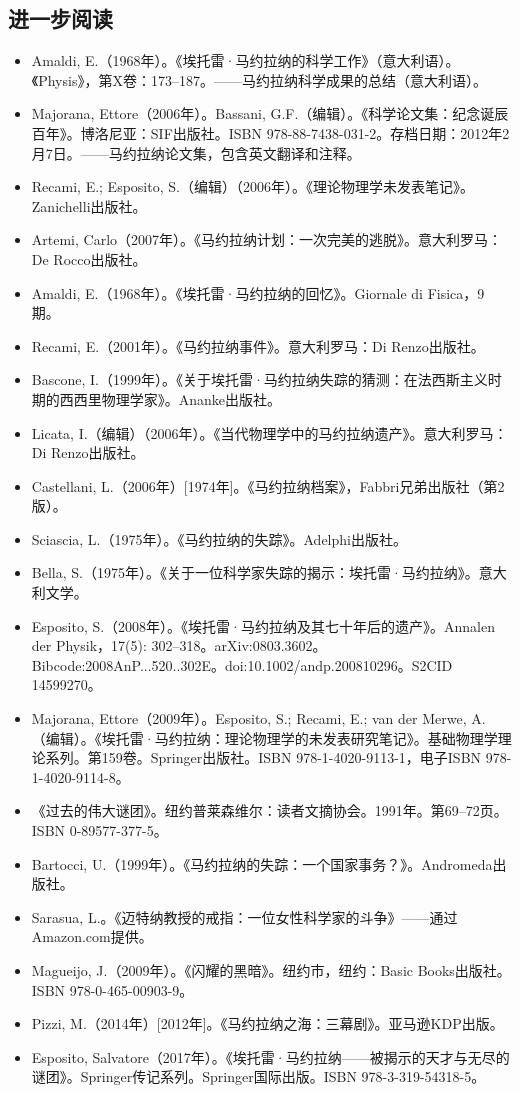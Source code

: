 \subsection{进一步阅读}
\begin{itemize}
\item Amaldi, E.（1968年）。《埃托雷·马约拉纳的科学工作》（意大利语）。《Physis》，第X卷：173–187。——马约拉纳科学成果的总结（意大利语）。
\item Majorana, Ettore（2006年）。Bassani, G.F.（编辑）。《科学论文集：纪念诞辰百年》。博洛尼亚：SIF出版社。ISBN 978-88-7438-031-2。存档日期：2012年2月7日。——马约拉纳论文集，包含英文翻译和注释。
\item Recami, E.; Esposito, S.（编辑）（2006年）。《理论物理学未发表笔记》。Zanichelli出版社。
\item Artemi, Carlo（2007年）。《马约拉纳计划：一次完美的逃脱》。意大利罗马：De Rocco出版社。
\item Amaldi, E.（1968年）。《埃托雷·马约拉纳的回忆》。Giornale di Fisica，9期。
\item Recami, E.（2001年）。《马约拉纳事件》。意大利罗马：Di Renzo出版社。
\item Bascone, I.（1999年）。《关于埃托雷·马约拉纳失踪的猜测：在法西斯主义时期的西西里物理学家》。Ananke出版社。
\item Licata, I.（编辑）（2006年）。《当代物理学中的马约拉纳遗产》。意大利罗马：Di Renzo出版社。
\item Castellani, L.（2006年）[1974年]。《马约拉纳档案》，Fabbri兄弟出版社（第2版）。
\item Sciascia, L.（1975年）。《马约拉纳的失踪》。Adelphi出版社。
\item Bella, S.（1975年）。《关于一位科学家失踪的揭示：埃托雷·马约拉纳》。意大利文学。
\item Esposito, S.（2008年）。《埃托雷·马约拉纳及其七十年后的遗产》。Annalen der Physik，17(5): 302–318。arXiv:0803.3602。Bibcode:2008AnP...520..302E。doi:10.1002/andp.200810296。S2CID 14599270。
\item Majorana, Ettore（2009年）。Esposito, S.; Recami, E.; van der Merwe, A.（编辑）。《埃托雷·马约拉纳：理论物理学的未发表研究笔记》。基础物理学理论系列。第159卷。Springer出版社。ISBN 978-1-4020-9113-1，电子ISBN 978-1-4020-9114-8。
\item 《过去的伟大谜团》。纽约普莱森维尔：读者文摘协会。1991年。第69–72页。ISBN 0-89577-377-5。
\item Bartocci, U.（1999年）。《马约拉纳的失踪：一个国家事务？》。Andromeda出版社。
\item Sarasua, L.。《迈特纳教授的戒指：一位女性科学家的斗争》——通过Amazon.com提供。
\item Magueijo, J.（2009年）。《闪耀的黑暗》。纽约市，纽约：Basic Books出版社。ISBN 978-0-465-00903-9。
\item Pizzi, M.（2014年）[2012年]。《马约拉纳之海：三幕剧》。亚马逊KDP出版。
\item Esposito, Salvatore（2017年）。《埃托雷·马约拉纳——被揭示的天才与无尽的谜团》。Springer传记系列。Springer国际出版。ISBN 978-3-319-54318-5。
\end{itemize}